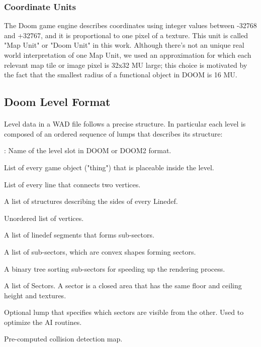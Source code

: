 \subsubsection{Coordinate Units} \label{par:coords} The Doom game engine describes coordinates using integer values between -32768 and +32767, and it is proportional to one pixel of a texture. This unit is called "Map Unit" or "Doom Unit" in this work. Although there's not an unique real world interpretation of one Map Unit, we used an approximation for which each relevant map tile or image pixel is 32x32 MU large; this choice is motivated by the fact that the smallest radius of a functional object in DOOM is 16 MU. 

\newpage

\subsection{Doom Level Format}
\paragraph{} Level data in a \gls{WAD} file follows a precise structure. In particular each level is composed of an ordered sequence of lumps that describes its structure:
	\begin{description}[wide=\parindent]
		\item[(NAME)]: Name of the level slot in DOOM or DOOM2 format.
		\item[THINGS] List of every game object ("\gls{thing}") that is placeable inside the level.
		\item[LINEDEFS] List of every line that connects two vertices.
		\item[SIDEDEFS] A list of structures describing the sides of every Linedef.
		\item[VERTEXES] Unordered list of vertices.
		\item[SEGS] A list of linedef segments that forms sub-sectors.
		\item[SSECTORS] A list of sub-sectors, which are convex shapes forming sectors.
		\item[NODES] A binary tree sorting sub-sectors for speeding up the rendering process.
		\item[SECTORS] A list of Sectors. A \gls{sector} is a closed area that has the same floor and ceiling height and textures.
		\item[REJECT] Optional lump that specifies which sectors are visible from the other. Used to optimize the AI routines.
		\item[BLOCKMAP] Pre-computed collision detection map. 
	\end{description}

